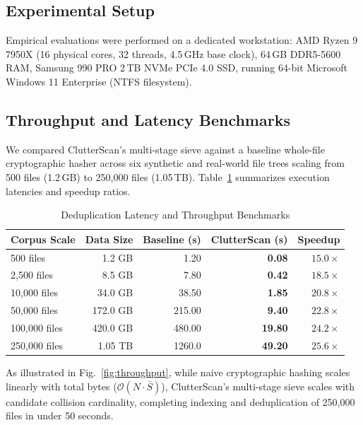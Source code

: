 \documentclass[journal,compsoc,10pt,twocolumn]{IEEEtran}
\begin{document}
\subsection{Experimental Setup}
Empirical evaluations were performed on a dedicated workstation: AMD Ryzen 9 7950X (16 physical cores, 32 threads, 4.5\,GHz base clock), 64\,GB DDR5-5600 RAM, Samsung 990 PRO 2\,TB NVMe PCIe 4.0 SSD, running 64-bit Microsoft Windows 11 Enterprise (NTFS filesystem).

\subsection{Throughput and Latency Benchmarks}
We compared ClutterScan's multi-stage sieve against a baseline whole-file cryptographic hasher across six synthetic and real-world file trees scaling from 500 files (1.2\,GB) to 250,000 files (1.05\,TB). Table~\ref{tab:benchmarks} summarizes execution latencies and speedup ratios.

\begin{table}[h]
\caption{Deduplication Latency and Throughput Benchmarks}
\label{tab:benchmarks}
\centering
\small
\begin{tabularx}{\columnwidth}{lrrrr}
\toprule
\textbf{Corpus Scale} & \textbf{Data Size} & \textbf{Baseline (s)} & \textbf{ClutterScan (s)} & \textbf{Speedup} \\
\midrule
500 files       & 1.2 GB    & 1.20   & \textbf{0.08}  & $15.0\times$ \\
2,500 files     & 8.5 GB    & 7.80   & \textbf{0.42}  & $18.5\times$ \\
10,000 files    & 34.0 GB   & 38.50  & \textbf{1.85}  & $20.8\times$ \\
50,000 files    & 172.0 GB  & 215.00 & \textbf{9.40}  & $22.8\times$ \\
100,000 files   & 420.0 GB  & 480.00 & \textbf{19.80} & $24.2\times$ \\
250,000 files   & 1.05 TB   & 1260.0 & \textbf{49.20} & $\mathbf{25.6\times}$ \\
\bottomrule
\end{tabularx}
\end{table}

As illustrated in Fig.~\ref{fig:throughput}, while naive cryptographic hashing scales linearly with total bytes ($\mathcal{O}(N \cdot \bar{S})$), ClutterScan's multi-stage sieve scales with candidate collision cardinality, completing indexing and deduplication of 250,000 files in under 50 seconds.
\end{document}
